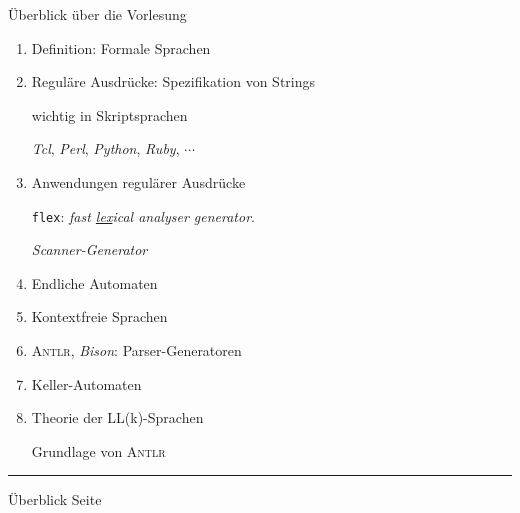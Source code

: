 \documentclass{slides}
\newcounter{mypage}
\begin{document}
\begin{slide}{}
\normalsize
\begin{center}
\"Uberblick \"uber die Vorlesung
\end{center}
\vspace{0.5cm}

\footnotesize
\begin{enumerate}
\item Definition: Formale Sprachen
\item Regul\"are Ausdr\"ucke: Spezifikation von Strings

      wichtig in Skriptsprachen
 
      \textsl{Tcl}, \textsl{Perl}, \textsl{Python}, \textsl{Ruby}, $\cdots$
\item Anwendungen regul\"arer Ausdr\"ucke

      \texttt{flex}: \emph{\underline{f}ast \underline{lex}ical analyser generator}.

      \emph{Scanner-Generator}
\item Endliche Automaten
      
\item Kontextfreie Sprachen

\item \textsc{Antlr}, \textsl{Bison}: Parser-Generatoren

\item Keller-Automaten

\item Theorie der LL(k)-Sprachen

      Grundlage von \textsc{Antlr}
\end{enumerate}

\vspace*{\fill}
\tiny \addtocounter{mypage}{1}
\rule{17cm}{1mm}
\"Uberblick  \hspace*{\fill} Seite 
\end{slide}

\end{document}

